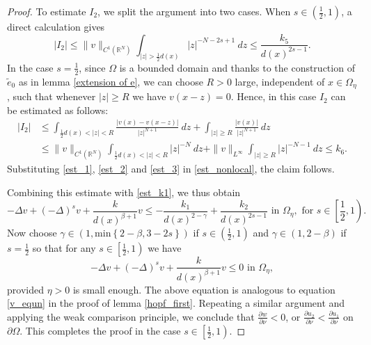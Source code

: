 \documentclass[10pt,a4paper]{amsart}
\newcommand{\De}{\Delta}
\newcommand{\Om}{\Omega}
\newcommand{\ba}{\beta}
\newcommand{\pa}{\partial}
\newcommand{\sr}{\mathbb{R}}
\begin{document}
\begin{proof}
    To estimate $I_2$, we split the argument into two cases. When $s\in \left(\frac{1}{2},1\right)$, a direct calculation gives
    \begin{equation}\label{est_2}
        |I_2| \leq \|v\|_{C^1(\sr^N)} \int_{|z|>\frac{1}{2}d(x)} |z|^{-N-2s+1}\ dz \leq \frac{k_5}{d(x)^{2s-1}}.
    \end{equation}
    In the case $s= \frac{1}{2}$, since $\Om$ is a bounded domain and thanks to the construction of $\tilde{e}_0$ as in lemma \ref{extension of e}, we can choose $R>0$ large, independent of $x\in\Om_{\eta}$, such that whenever $|z|\geq R$ we have $v(x-z)=0$. Hence, in this case $I_2$ can be estimated as follows:
    \begin{align}\label{est_3}
        |I_2| &\leq \int_{\frac{1}{2}d(x) < |z| < R} \frac{|v(x) - v(x-z)|}{|z|^{N+1}}\ dz + \int_{|z|\geq R} \frac{|v(x)|}{|z|^{N+1}}\ dz\nonumber\\
        &\leq \|v\|_{C^1 (\sr^N)} \int_{\frac{1}{2}d(x) < |z| <R} |z|^{-N}\ dz + \|v\|_{L^{\infty}} \int_{|z|\geq R} |z|^{-N-1}\ dz \leq k_6.
    \end{align}
    Substituting \eqref{est_1}, \eqref{est_2} and \eqref{est_3} in \eqref{est_nonlocal}, the claim follows.

    Combining this estimate with \eqref{est_k1}, we thus obtain
    \begin{equation}\label{v_equn_second}
        -\Delta v + (-\De)^s v + \frac{k}{d(x)^{\ba +1}} v \leq - \frac{k_1}{d(x)^{2-\gamma}} + \frac{k_2}{d(x)^{2s-1}} \text{ in } \Om_{\eta}, \text{ for } s\in \left[\frac{1}{2},1 \right).
    \end{equation}
    Now choose $\gamma \in \left(1, \text{min} \left\{ 2-\beta, 3-2s \right\} \right)$ if $s\in \left(\frac{1}{2},1 \right)$ and $\gamma \in (1, 2- \ba)$ if $s= \frac{1}{2}$ so that for any $s\in \left[ \frac{1}{2}, 1 \right)$ we have
    \begin{equation}\label{v_equn_third}
        -\Delta v + (-\De)^s v + \frac{k}{d(x)^{\ba +1}} v \leq 0 \text{ in } \Om_{\eta},
    \end{equation}
    provided $\eta>0$ is small enough. The above equation is analogous to equation \eqref{v_equn} in the proof of lemma \ref{hopf_first}. Repeating a similar argument and applying the weak comparison principle, we conclude that $\frac{\pa w}{\pa \nu}<0$, or $\frac{\pa u_2}{\pa\nu} < \frac{\pa u_1}{\pa\nu}$ on $\pa\Om$. This completes the proof in the case $s\in \left[ \frac{1}{2},1 \right)$.
\end{proof}
\end{document}
